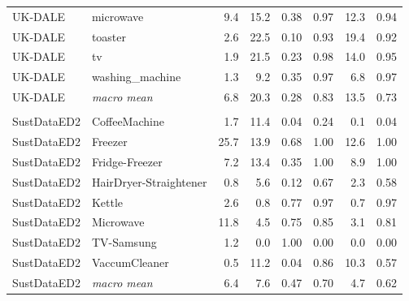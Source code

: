 \begin{table}[H]
\begin{tabular}{@{}llrrrrrr@{}}
UK-DALE & microwave & 9.4 & 15.2 & 0.38 & 0.97 & 12.3 & 0.94 \\
UK-DALE & toaster & 2.6 & 22.5 & 0.10 & 0.93 & 19.4 & 0.92 \\
UK-DALE & tv & 1.9 & 21.5 & 0.23 & 0.98 & 14.0 & 0.95 \\
UK-DALE & washing\_machine & 1.3 & 9.2 & 0.35 & 0.97 & 6.8 & 0.97 \\
UK-DALE & \textit{macro mean} & 6.8 & 20.3 & 0.28 & 0.83 & 13.5 & 0.73 \\
\midrule \\
SustDataED2 & CoffeeMachine & 1.7 & 11.4 & 0.04 & 0.24 & 0.1 & 0.04 \\
SustDataED2 & Freezer & 25.7 & 13.9 & 0.68 & 1.00 & 12.6 & 1.00 \\
SustDataED2 & Fridge-Freezer & 7.2 & 13.4 & 0.35 & 1.00 & 8.9 & 1.00 \\
SustDataED2 & HairDryer-Straightener & 0.8 & 5.6 & 0.12 & 0.67 & 2.3 & 0.58 \\
SustDataED2 & Kettle & 2.6 & 0.8 & 0.77 & 0.97 & 0.7 & 0.97 \\
SustDataED2 & Microwave & 11.8 & 4.5 & 0.75 & 0.85 & 3.1 & 0.81 \\
SustDataED2 & TV-Samsung & 1.2 & 0.0 & 1.00 & 0.00 & 0.0 & 0.00 \\
SustDataED2 & VaccumCleaner & 0.5 & 11.2 & 0.04 & 0.86 & 10.3 & 0.57 \\
SustDataED2 & \textit{macro mean} & 6.4 & 7.6 & 0.47 & 0.70 & 4.7 & 0.62 \\
\bottomrule
\end{tabular}
\end{table}


